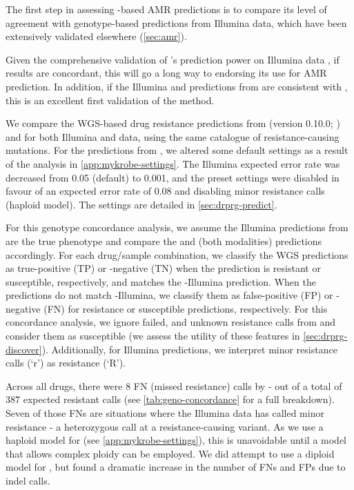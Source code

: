 The first step in assessing \ont{}-based AMR predictions is to compare its level of agreement with genotype-based predictions from Illumina data, which have been extensively validated elsewhere (\autoref{sec:amr}).

Given the comprehensive validation of \mykrobe{}'s prediction power on Illumina data \cite{hunt2019,bradley2015}, if \ont{} results are concordant, this will go a long way to endorsing its use for AMR prediction. In addition, if the Illumina and \ont{} predictions from \drprg{} are consistent with \mykrobe{}, this is an excellent first validation of the method.

We compare the WGS-based drug resistance predictions from \mykrobe{} (version 0.10.0; \cite{hunt2019}) and \drprg{} for both Illumina and \ont{} data, using the same catalogue of resistance-causing mutations. For the predictions from \mykrobe{}, we altered some default settings as a result of the analysis in \autoref{app:mykrobe-settings}. The Illumina expected error rate was decreased from 0.05 (default) to 0.001, and the preset \ont{} settings were disabled in favour of an expected error rate of 0.08 and disabling minor resistance calls (haploid model). The \drprg{} settings are detailed in \autoref{sec:drprg-predict}. 

For this genotype concordance analysis, we assume the Illumina predictions from \mykrobe{} are the true phenotype and compare the \mykrobe{} \ont{} and \drprg{} (both modalities) predictions accordingly. For each drug/sample combination, we classify the WGS predictions as true-positive (TP) or -negative (TN) when the prediction is resistant or susceptible, respectively, and matches the \mykrobe{}-Illumina prediction. When the predictions do not match \mykrobe{}-Illumina, we classify them as false-positive (FP) or -negative (FN) for resistance or susceptible predictions, respectively. For this concordance analysis, we ignore failed, and unknown resistance calls from \drprg{} and consider them as susceptible (we assess the utility of these features in \autoref{sec:drprg-discover}). Additionally, for \mykrobe{} Illumina predictions, we interpret minor resistance calls (`r') as resistance (`R').

Across all drugs, there were 8 FN (missed resistance) calls by \mykrobe{} \ont{} - out of a total of 387 expected resistant calls (see \autoref{tab:geno-concordance} for a full breakdown). Seven of those FNs are situations where the Illumina data has called minor resistance - a heterozygous call at a resistance-causing variant. As we use a haploid model for \ont{} (see \autoref{app:mykrobe-settings}), this is unavoidable until a model that allows complex ploidy can be employed. We did attempt to use a diploid model for \ont{}, but found a dramatic increase in the number of FNs and FPs due to indel calls.

